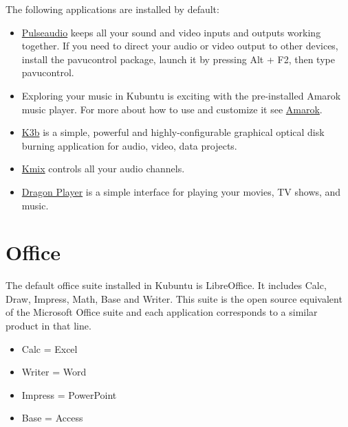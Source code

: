\documentclass[letterpaper,10pt,english]{sphinxmanual}
\begin{document}
The following applications are installed by default:
\begin{itemize}
\item {} 
\href{https://wiki.ubuntu.com/PulseAudio}{Pulseaudio} keeps all your sound and video inputs and outputs working together. If you need to direct your audio or video output to other devices, install the pavucontrol package, launch it by pressing Alt + F2, then type pavucontrol.

\item {} 
Exploring your music in Kubuntu is exciting with the pre-installed Amarok music player. For more about how to use and customize it see \href{https://userbase.kde.org/Special:MyLanguage/Amarok}{Amarok}.

\item {} 
\href{https://userbase.kde.org/Special:MyLanguage/K3b}{K3b} is a simple, powerful and highly-configurable graphical optical disk burning application for audio, video, data projects.

\item {} 
\href{https://userbase.kde.org/Special:MyLanguage/KMix}{Kmix} controls all your audio channels.

\item {} 
\href{https://userbase.kde.org/Special:MyLanguage/Dragon\_Player}{Dragon Player} is a simple interface for playing your movies, TV shows, and music.

\end{itemize}


\section{Office}
\label{docs/software:office}
The default office suite installed in Kubuntu is LibreOffice. It includes Calc, Draw, Impress, Math, Base and Writer. This suite is the open source equivalent of the Microsoft Office suite and each application corresponds to a similar product in that line.
\begin{itemize}
\item {} 
Calc = Excel

\item {} 
Writer = Word

\item {} 
Impress = PowerPoint

\item {} 
Base = Access

\end{itemize}
\end{document}
